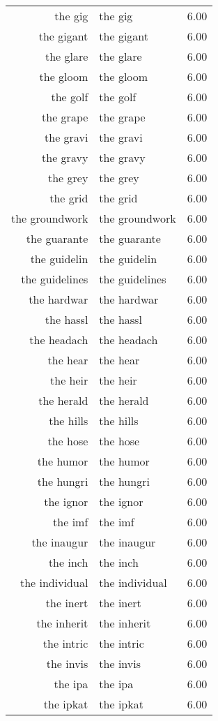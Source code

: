 \begin{table}[ht]
\begin{tabular}{rlr}
  the gig & the gig & 6.00 \\ 
  the gigant & the gigant & 6.00 \\ 
  the glare & the glare & 6.00 \\ 
  the gloom & the gloom & 6.00 \\ 
  the golf & the golf & 6.00 \\ 
  the grape & the grape & 6.00 \\ 
  the gravi & the gravi & 6.00 \\ 
  the gravy & the gravy & 6.00 \\ 
  the grey & the grey & 6.00 \\ 
  the grid & the grid & 6.00 \\ 
  the groundwork & the groundwork & 6.00 \\ 
  the guarante & the guarante & 6.00 \\ 
  the guidelin & the guidelin & 6.00 \\ 
  the guidelines & the guidelines & 6.00 \\ 
  the hardwar & the hardwar & 6.00 \\ 
  the hassl & the hassl & 6.00 \\ 
  the headach & the headach & 6.00 \\ 
  the hear & the hear & 6.00 \\ 
  the heir & the heir & 6.00 \\ 
  the herald & the herald & 6.00 \\ 
  the hills & the hills & 6.00 \\ 
  the hose & the hose & 6.00 \\ 
  the humor & the humor & 6.00 \\ 
  the hungri & the hungri & 6.00 \\ 
  the ignor & the ignor & 6.00 \\ 
  the imf & the imf & 6.00 \\ 
  the inaugur & the inaugur & 6.00 \\ 
  the inch & the inch & 6.00 \\ 
  the individual & the individual & 6.00 \\ 
  the inert & the inert & 6.00 \\ 
  the inherit & the inherit & 6.00 \\ 
  the intric & the intric & 6.00 \\ 
  the invis & the invis & 6.00 \\ 
  the ipa & the ipa & 6.00 \\ 
  the ipkat & the ipkat & 6.00 \\ 

\end{tabular}
\end{table}
